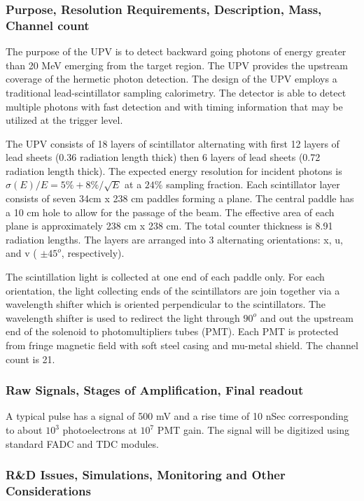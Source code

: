 \subsubsection*{Purpose, Resolution Requirements, Description, Mass, Channel count}

The purpose of the UPV is to detect backward going photons of energy greater than 20 MeV 
emerging from the target region. The UPV provides the upstream coverage of the hermetic 
photon detection. The design of the UPV employs a traditional lead-scintillator sampling 
calorimetry.   The detector is able to detect multiple photons with fast detection and 
with timing information that may be utilized at the trigger level.

The UPV consists of 18 layers of scintillator alternating with first 12 layers of lead 
sheets (0.36 radiation length thick) then 6 layers of  lead sheets (0.72 radiation 
length thick). The expected energy resolution for incident photons is 
$\sigma(E)/E = 5\% + 8\%/\sqrt{E}$ at a $24\%$ sampling fraction. Each  scintillator 
layer consists of seven 34cm x 238 cm paddles forming a plane. The central paddle 
has a 10 cm hole to allow for the passage of the beam. The effective area of each 
plane is approximately 238 cm x 238 cm. The total counter thickness is 8.91 
radiation lengths.   The layers are arranged into 3 alternating orientations: 
x, u, and v ( $\pm45^o$, respectively).  


The scintillation light is collected at one end of each paddle only.  For each 
orientation, the light collecting ends of the scintillators are join together 
via a wavelength shifter which is oriented perpendicular to the  scintillators.  
The wavelength shifter is used to redirect the light through $90^o$ and out the 
upstream end of the solenoid to photomultipliers tubes (PMT).  Each PMT is 
protected from fringe magnetic field with soft steel casing and mu-metal shield. 
The channel count is 21.

\subsubsection*{Raw Signals, Stages of Amplification, Final readout}

A typical pulse has a signal of 500 mV and a rise time of 10 nSec corresponding 
to about $10^3$ photoelectrons at $10^7$ PMT gain. The signal will be digitized 
using standard FADC and TDC modules.  

\subsubsection*{R\&D Issues, Simulations, Monitoring and Other Considerations}


